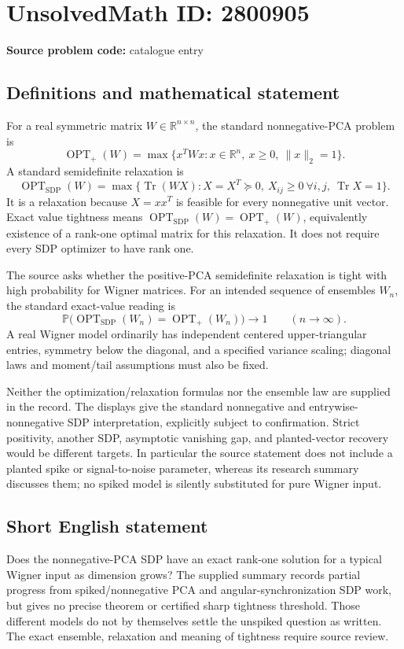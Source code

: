 \documentclass[11pt]{article}
\newcommand{\R}{\mathbb{R}}
\begin{document}
\section*{UnsolvedMath ID: 2800905}
\textbf{Source problem code:} catalogue entry
\subsection{Definitions and mathematical statement}
For a real symmetric matrix $W\in\R^{n\times n}$, the standard nonnegative-PCA problem is
\[
 \operatorname{OPT}_+(W)=\max\{x^TWx:x\in\R^n,\ x\geq0,\ \|x\|_2=1\}.
\]
A standard semidefinite relaxation is
\[
 \operatorname{OPT}_{\mathrm{SDP}}(W)
 =\max\{\operatorname{Tr}(WX):X=X^T\succeq0,\ X_{ij}\geq0\ \forall i,j,
                                      \ \operatorname{Tr}X=1\}.
\]
It is a relaxation because $X=xx^T$ is feasible for every nonnegative unit vector. Exact value tightness means $\operatorname{OPT}_{\mathrm{SDP}}(W)=\operatorname{OPT}_+(W)$, equivalently existence of a rank-one optimal matrix for this relaxation. It does not require every SDP optimizer to have rank one.

The source asks whether the positive-PCA semidefinite relaxation is tight with high probability for Wigner matrices. For an intended sequence of ensembles $W_n$, the standard exact-value reading is
\[
 \mathbb P\bigl(\operatorname{OPT}_{\mathrm{SDP}}(W_n)
                  =\operatorname{OPT}_+(W_n)\bigr)\longrightarrow1
 \qquad(n\to\infty).
\]
A real Wigner model ordinarily has independent centered upper-triangular entries, symmetry below the diagonal, and a specified variance scaling; diagonal laws and moment/tail assumptions must also be fixed.

Neither the optimization/relaxation formulas nor the ensemble law are supplied in the record. The displays give the standard nonnegative and entrywise-nonnegative SDP interpretation, explicitly subject to confirmation. Strict positivity, another SDP, asymptotic vanishing gap, and planted-vector recovery would be different targets. In particular the source statement does not include a planted spike or signal-to-noise parameter, whereas its research summary discusses them; no spiked model is silently substituted for pure Wigner input.
\subsection{Short English statement}
Does the nonnegative-PCA SDP have an exact rank-one solution for a typical Wigner input as dimension grows? The supplied summary records partial progress from spiked/nonnegative PCA and angular-synchronization SDP work, but gives no precise theorem or certified sharp tightness threshold. Those different models do not by themselves settle the unspiked question as written. The exact ensemble, relaxation and meaning of tightness require source review.
\end{document}
